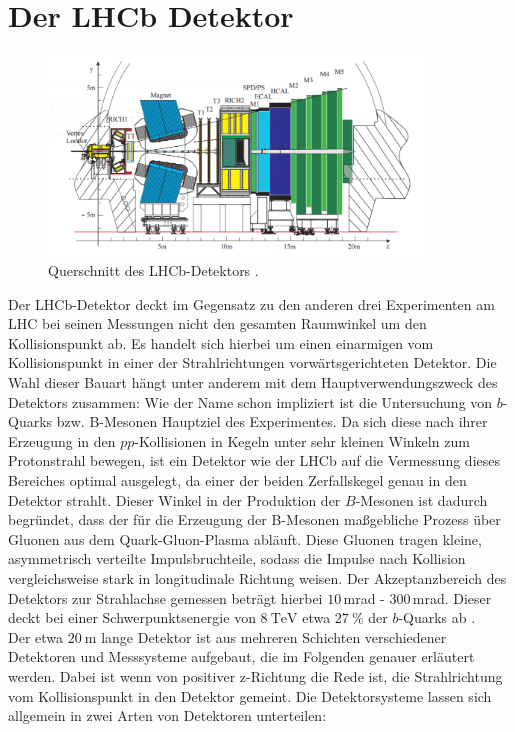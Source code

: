 \section{Der LHCb Detektor}
%
\begin{figure}[H]
  \centering
      \includegraphics[width=0.9\textwidth]{Plots/lhcb.pdf}
  \caption{Querschnitt des LHCb-Detektors \cite{lhcb}.}
  \label{fig:lhcb}
\end{figure}
%
Der LHCb-Detektor deckt im Gegensatz zu den anderen drei Experimenten am LHC bei seinen Messungen nicht den gesamten Raumwinkel um den Kollisionspunkt ab. Es handelt sich hierbei um einen einarmigen vom Kollisionspunkt in einer der Strahlrichtungen vorwärtsgerichteten Detektor. Die Wahl dieser Bauart hängt unter anderem mit dem Hauptverwendungszweck des Detektors zusammen: Wie der Name schon impliziert ist die Untersuchung von $b$-Quarks bzw. B-Mesonen Hauptziel des Experimentes. Da sich diese nach ihrer Erzeugung in den $pp$-Kollisionen in Kegeln unter sehr kleinen Winkeln zum Protonstrahl bewegen, ist ein Detektor wie der LHCb auf die Vermessung dieses Bereiches optimal ausgelegt, da einer der beiden Zerfallskegel genau in den Detektor strahlt. Dieser Winkel in der Produktion der $B$-Mesonen ist dadurch begründet, dass der für die Erzeugung der B-Mesonen maßgebliche Prozess über Gluonen aus dem Quark-Gluon-Plasma abläuft. Diese Gluonen tragen kleine, asymmetrisch verteilte Impulsbruchteile, sodass die Impulse nach Kollision vergleichsweise stark in longitudinale Richtung weisen. Der Akzeptanzbereich des Detektors zur Strahlachse gemessen beträgt hierbei $10$\,mrad - $300$\,mrad. Dieser deckt bei einer Schwerpunktsenergie von $\SI{8}{\tera\electronvolt}$ etwa $\SI{27}{\percent}$ der $b$-Quarks ab \cite{rad}.\\
%
Der etwa $\SI{20}{\meter}$ lange Detektor ist aus mehreren Schichten verschiedener Detektoren und Messsysteme aufgebaut, die im Folgenden genauer erläutert werden. Dabei ist wenn von positiver z-Richtung die Rede ist, die Strahlrichtung vom Kollisionspunkt in den Detektor gemeint. Die Detektorsysteme lassen sich allgemein in zwei Arten von Detektoren unterteilen:
